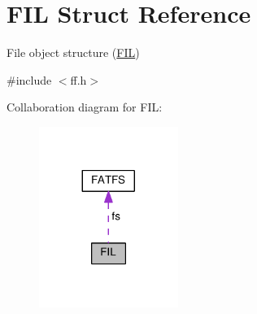 \hypertarget{structFIL}{}\section{F\+IL Struct Reference}
\label{structFIL}


File object structure (\hyperlink{structFIL}{F\+IL})  




{\ttfamily \#include $<$ff.\+h$>$}



Collaboration diagram for F\+IL\+:\nopagebreak
\begin{figure}[H]
\begin{center}
\leavevmode
\includegraphics[width=128pt]{structFIL__coll__graph}
\end{center}
\end{figure}
